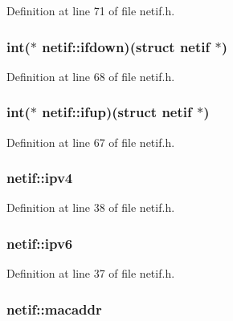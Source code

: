 Definition at line 71 of file netif.\+h.

\hypertarget{structnetif_a73d7967fecfead19c8ae2a39a8cbf112}{
\subsubsection[{ifdown}]{\setlength{\rightskip}{0pt plus 5cm}int($\ast$ netif\+::ifdown)(struct {\bf netif} $\ast$)}}\label{structnetif_a73d7967fecfead19c8ae2a39a8cbf112}


Definition at line 68 of file netif.\+h.

\hypertarget{structnetif_a70984b0d611d5a941aecabbc98f62467}{
\subsubsection[{ifup}]{\setlength{\rightskip}{0pt plus 5cm}int($\ast$ netif\+::ifup)(struct {\bf netif} $\ast$)}}\label{structnetif_a70984b0d611d5a941aecabbc98f62467}


Definition at line 67 of file netif.\+h.

\hypertarget{structnetif_a312a8e870ce8803f02f5b09012ce6bc6}{
\subsubsection[{ipv4}]{ netif\+::ipv4}}\label{structnetif_a312a8e870ce8803f02f5b09012ce6bc6}


Definition at line 38 of file netif.\+h.

\hypertarget{structnetif_aced1ed63f6f33dd3987a06deee6a2292}{
\subsubsection[{ipv6}]{ netif\+::ipv6}}\label{structnetif_aced1ed63f6f33dd3987a06deee6a2292}


Definition at line 37 of file netif.\+h.

\hypertarget{structnetif_a7a5c433a646e2b4424fe8ebf12db535c}{
\subsubsection[{macaddr}]{ netif\+::macaddr}}\label{structnetif_a7a5c433a646e2b4424fe8ebf12db535c}


